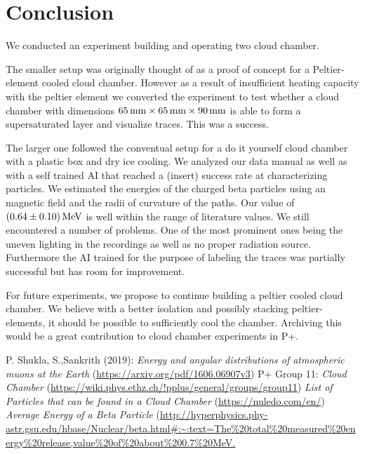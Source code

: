 \documentclass[10pt,a4paper]{article}
\begin{document}
\section{Conclusion}
We conducted an experiment building and operating two cloud chamber. 

The smaller setup was originally thought of as a proof of concept for a Peltier-element cooled cloud chamber. However as a result of insufficient heating capacity with the peltier element we converted the experiment to test whether a cloud chamber with dimensions $\qtyproduct{65 x 65 x 90}{\milli\meter}$ is able to form a supersaturated layer and visualize traces. This was a success.

The larger one followed the conventual setup for a do it yourself cloud chamber with a plastic box and dry ice cooling. We analyzed our data manual as well as with a self trained AI that reached a (insert) success rate at characterizing particles. We estimated the energies of the charged beta particles using an magnetic field and the radii of curvature of the paths. Our value of $\qty{0.64 \pm 0.10}{\mega\electronvolt}$ is well within the range of literature values.
We still encountered a number of problems. One of the most prominent ones being the uneven lighting in the recordings as well as no proper radiation source. Furthermore the AI trained for the purpose of labeling the traces was partially successful but has room for improvement.

For future experiments, we propose to continue building a peltier cooled cloud chamber. We believe with a better isolation and possibly stacking peltier-elements, it should be possible to sufficiently cool the chamber. Archiving this would be a great contribution to cloud chamber experiments in P+.



\newpage

\begin{thebibliography}{99}
P. Shukla, S.,Sankrith (2019): \textit{Energy and angular distributions of atmospheric muons at the Earth} (\url{https://arxiv.org/pdf/1606.06907v3})
 P+ Group 11: \textit{Cloud Chamber}
(\url{https://wiki.phys.ethz.ch/!pplus/general/groups/group11})
 \textit{List of Particles that can be found in a Cloud Chamber}
 (\url{https://nuledo.com/en/})
 \textit{Average Energy of a Beta Particle}
 (\url{http://hyperphysics.phy-astr.gsu.edu/hbase/Nuclear/beta.html#:~:text=The%20total%20measured%20energy%20release,value%20of%20about%200.7%20MeV.}
\end{thebibliography}
\end{document}

